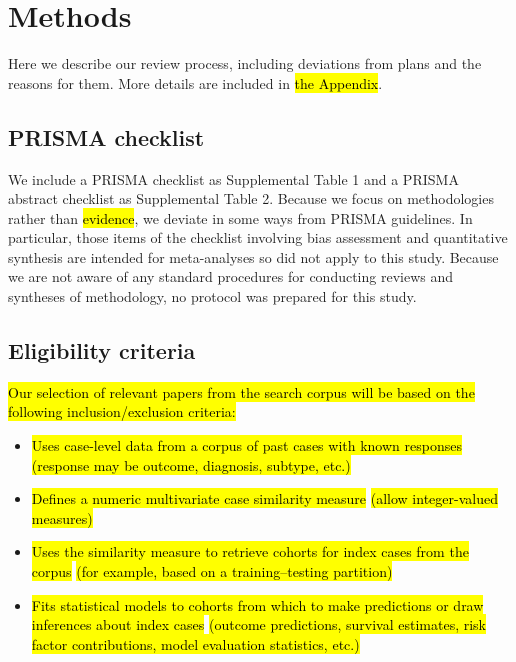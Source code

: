 \documentclass[sn-mathphys,Numbered,pdflatex]{sn-jnl}
\theoremstyle{remark}
\theoremstyle{definition}
\providecommand{\tightlist}{%
  \setlength{\itemsep}{0pt}\setlength{\parskip}{0pt}}
\begin{document}
\section{Methods}\label{methods}

Here we describe our review process, including deviations from plans and
the reasons for them. More details are included in \hl{the Appendix}.

\subsection{PRISMA checklist}\label{prisma-checklist}

We include a PRISMA checklist as Supplemental Table 1 and a PRISMA
abstract checklist as Supplemental Table 2. Because we focus on
methodologies rather than\hl{ evidence}, we deviate in some ways from
PRISMA guidelines. In particular, those items of the checklist involving
bias assessment and quantitative synthesis are intended for
meta-analyses so did not apply to this study. Because we are not aware
of any standard procedures for conducting reviews and syntheses of
methodology, no protocol was prepared for this study.

\subsection{Eligibility criteria}\label{eligibility-criteria}

\hl{Our selection of relevant papers from the search corpus will be based on the following inclusion/exclusion criteria:}

\begin{itemize}
\tightlist
\item
  \hl{Uses case-level data from a corpus of past cases with known responses}\newline
  \hl{(response may be outcome, diagnosis, subtype, etc.)}
\item
  \hl{Defines a numeric multivariate case similarity measure}\newline
  \hl{(allow integer-valued measures)}
\item
  \hl{Uses the similarity measure to retrieve cohorts for index cases from the corpus}\newline
  \hl{(for example, based on a training--testing partition)}
\item
  \hl{Fits statistical models to cohorts from which to make predictions or draw inferences about index cases}\newline
  \hl{(outcome predictions, survival estimates, risk factor contributions, model evaluation statistics, etc.)}
\end{itemize}
\end{document}
